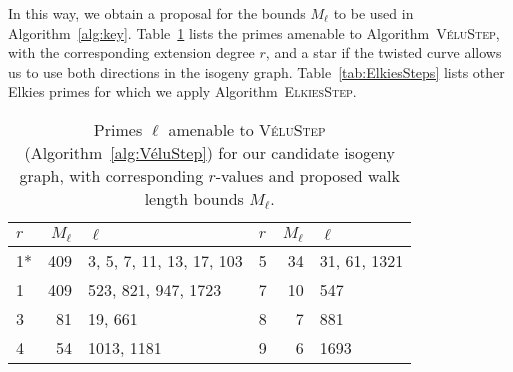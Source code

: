 \documentclass{llncs}
\newcommand{\algstyle}[1]{\textsc{#1}}
\begin{document}
In this way, we obtain a proposal for the bounds $M_\ell$
to be used in Algorithm~\ref{alg:key}. Table~\ref{tab:VéluSteps}
lists the primes amenable to Algorithm~\algstyle{VéluStep}, with
the corresponding extension degree $r$, and a star if the twisted curve
allows us to use both directions in the isogeny graph.
Table~\ref{tab:ElkiesSteps}
lists other Elkies primes for which we apply Algorithm~\algstyle{ElkiesStep}.

%
\begin{table}
    \centering
    \begin{tabular}{l|@{\;}r@{\;}|@{\;}l@{\;}||@{\;}l|r@{\;}|@{\;}l}
        $r$ & $M_\ell$ & $\ell$
        &
        $r$ & $M_\ell$ & $\ell$
        \\
        \hline
        1* & 409 & 3, 5, 7, 11, 13, 17, 103
        &
        5 & 34 & 31, 61, 1321
        \\
        1 & 409 & 523, 821, 947, 1723
        &
        7 & 10 & 547
        \\
        3 & 81 & 19, 661
        &
        8 & 7 & 881
        \\
        4 & 54 & 1013, 1181
        &
        9 & 6 & 1693
        \\
        \hline
    \end{tabular}
    \smallskip
    \caption{Primes $\ell$ amenable to \algstyle{VéluStep}
    (Algorithm~\ref{alg:VéluStep}) for our candidate isogeny graph,
    with corresponding $r$-values and proposed walk length bounds $M_\ell$.}
    \label{tab:VéluSteps}
\end{table}
\end{document}

